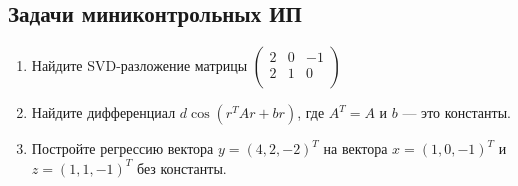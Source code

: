 \subsection{Задачи миниконтрольных ИП}

\begin{enumerate}
  \item Найдите SVD-разложение матрицы $
  \begin{pmatrix}
  2 & 0 & -1 \\
  2 & 1 & 0 \\
  \end{pmatrix}$
 \item Найдите дифференциал $d \cos(r^TAr+br)$, где $A^T=A$ и $b$ — это константы.
 \item Постройте регрессию вектора $y = (4,2,-2)^T$ на вектора $x=(1,0,-1)^T$ и $z=(1,1,-1)^T$
 без константы.
\end{enumerate}
